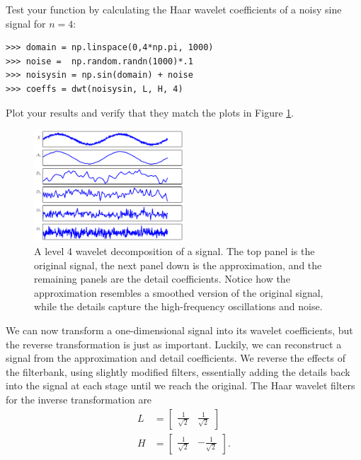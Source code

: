 Test your function by calculating the Haar wavelet coefficients of a noisy sine signal for $n=4$:
\begin{lstlisting}
>>> domain = np.linspace(0,4*np.pi, 1000)
>>> noise =  np.random.randn(1000)*.1
>>> noisysin = np.sin(domain) + noise
>>> coeffs = dwt(noisysin, L, H, 4)
\end{lstlisting}
Plot your results and verify that they match the plots in Figure \ref{fig:dwt1D}.

\begin{figure}
\centering
\includegraphics[width = 0.5\textwidth]{dwt1D}
\caption{A level 4 wavelet decomposition of a signal. The top panel is the original signal,
the next panel down is the approximation, and the remaining panels are the detail coefficients.
Notice how the approximation resembles a smoothed version of the original signal, while the
details capture the high-frequency oscillations and noise.}
\label{fig:dwt1D}
\end{figure}

We can now transform a one-dimensional signal into its wavelet coefficients,
but the reverse transformation is just as important.
Luckily, we can reconstruct a signal from the approximation and detail coefficients.
We reverse the effects of the filterbank, using slightly modified filters, essentially adding the details back into the
signal at each stage until we reach the original.
The Haar wavelet filters for the inverse transformation are
\begin{align*}
L &= \begin{bmatrix}\frac{1}{\sqrt{2}} & \frac{1}{\sqrt{2}}\end{bmatrix}\\
H &= \begin{bmatrix}\frac{1}{\sqrt{2}} & -\frac{1}{\sqrt{2}}\end{bmatrix}.
\end{align*}

